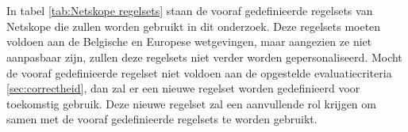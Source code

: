 
\chapter{}%
\label{ch:proofofconcept}

\section{}
\label{sec:DLP rules}

\subsection{}
\label{subsec:vooraf-gedefinieerde-regelsets}

In tabel \ref{tab:Netskope regelsets} staan de vooraf gedefinieerde regelsets van Netskope die zullen worden gebruikt in dit onderzoek. 
Deze regelsets moeten voldoen aan de Belgische en Europese wetgevingen, maar aangezien ze niet aanpasbaar zijn, zullen deze regelsets niet verder worden gepersonaliseerd. 
Mocht de vooraf gedefinieerde regelset niet voldoen aan de opgestelde evaluatiecriteria \ref{sec:correctheid}, dan zal er een nieuwe regelset worden gedefinieerd voor toekomstig gebruik. 
Deze nieuwe regelset zal een aanvullende rol krijgen om samen met de vooraf gedefinieerde regelsets te worden gebruikt.


